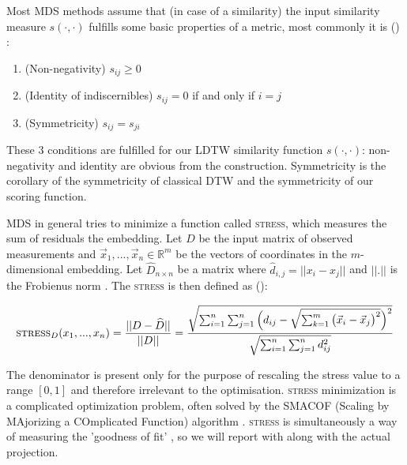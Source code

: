 Most MDS methods assume that (in case of a similarity) the input similarity measure $s(\cdot, \cdot)$ fulfills some basic properties of a metric, most commonly it is (\cite{mead1992review}) :

\begin{enumerate}
    \item (Non-negativity) $s_{ij} \geq 0$
    \item (Identity of indiscernibles) $s_{ij} = 0$ if and only if $i = j$
    \item (Symmetricity) $s_{ij} = s_{ji}$
\end{enumerate}

These $3$ conditions are fulfilled for our LDTW similarity function $s(\cdot, \cdot)$: non-negativity and identity are obvious from the construction. Symmetricity is the corollary of the symmetricity of classical DTW and the symmetricity of our scoring function.

MDS in general tries to minimize a function called \textsc{stress}, which measures the sum of residuals the embedding. Let $D$ be the input matrix of observed measurements and $\vec{x}_1, ..., \vec{x}_n \in \mathbb{R}^m$ be the vectors of coordinates in the $m$-dimensional embedding. Let $\widehat{D}_{n \times n}$ be a matrix where $\widehat{d}_{i,j} = ||x_i - x_j||$ and $||.||$ is the Frobienus norm \cite{frobnorm}. The \textsc{stress} is then defined as (\cite{kruskal1964nonmetric}):

\begin{equation}
    \textsc{stress}_{D}(x_1, ..., x_n) = \frac{
        ||D-\widehat{D}||
    }{
        ||D||
    } =
    \frac{
        \sqrt{ \sum_{i=1}^n \sum_{j=1}^n \Big( d_{ij} - \sqrt { \sum_{k=1}^m \big(
            \vec{x}_i - \vec{x}_j \big)^2 }
        \Big)^2 }
    }{
        \sqrt{ \sum_{i=1}^n \sum_{j=1}^n d_{ij}^2 }
    }
    \label{eq:stress}
\end{equation}

The denominator is present only for the purpose of rescaling the stress value to a range $[0, 1]$ and therefore irrelevant to the optimisation. \textsc{stress} minimization is a complicated optimization problem, often solved by the SMACOF (Scaling by MAjorizing a COmplicated Function) algorithm \cite{smacof}. \textsc{stress} is simultaneously a way of measuring the 'goodness of fit' \cite{kruskal1964nonmetric}, so we will report with along with the actual projection.

